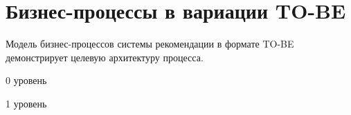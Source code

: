 \section{Бизнес-процессы в вариации TO-BE}

Модель бизнес-процессов системы рекомендации в формате TO-BE демонстрирует целевую архитектуру процесса.


\begin{image}
    \caption{0 уровень}
    \label{fig:idef0:0}
\end{image}


\begin{image}
    \caption{1 уровень}
    \label{fig:idef0:1}
\end{image}
